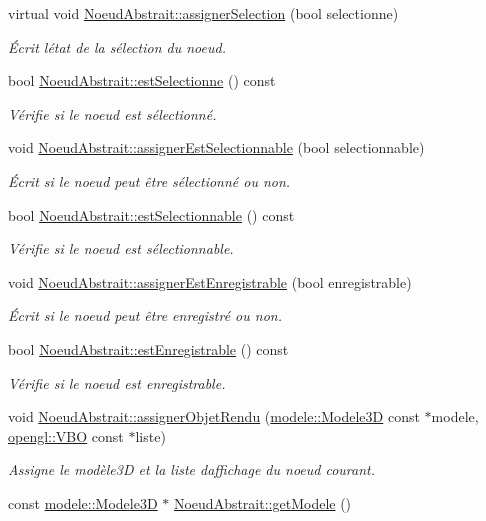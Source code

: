 \begin{DoxyCompactItemize}
virtual void \hyperlink{group__inf2990_ga0f39647390d357d8662a870f0c76242c}{Noeud\+Abstrait\+::assigner\+Selection} (bool selectionne)
\begin{DoxyCompactList}\small\item\em Écrit l\textquotesingle{}état de la sélection du noeud. \end{DoxyCompactList}\item 
bool \hyperlink{group__inf2990_ga8fb7a3313ce4d361ef7ec8e45ba8add5}{Noeud\+Abstrait\+::est\+Selectionne} () const 
\begin{DoxyCompactList}\small\item\em Vérifie si le noeud est sélectionné. \end{DoxyCompactList}\item 
void \hyperlink{group__inf2990_ga397add0bac7ec3b842598a2085990b7d}{Noeud\+Abstrait\+::assigner\+Est\+Selectionnable} (bool selectionnable)
\begin{DoxyCompactList}\small\item\em Écrit si le noeud peut être sélectionné ou non. \end{DoxyCompactList}\item 
bool \hyperlink{group__inf2990_gaa3f3a34571af62de0da5db2d8f54f690}{Noeud\+Abstrait\+::est\+Selectionnable} () const 
\begin{DoxyCompactList}\small\item\em Vérifie si le noeud est sélectionnable. \end{DoxyCompactList}\item 
void \hyperlink{group__inf2990_gabb7f3756a4094dc588690126ec0703d3}{Noeud\+Abstrait\+::assigner\+Est\+Enregistrable} (bool enregistrable)
\begin{DoxyCompactList}\small\item\em Écrit si le noeud peut être enregistré ou non. \end{DoxyCompactList}\item 
bool \hyperlink{group__inf2990_ga6a6af3639f1b4e3e33a126703376dcec}{Noeud\+Abstrait\+::est\+Enregistrable} () const 
\begin{DoxyCompactList}\small\item\em Vérifie si le noeud est enregistrable. \end{DoxyCompactList}\item 
void \hyperlink{group__inf2990_ga1f533acce98fbad7fa82758ccaea55ff}{Noeud\+Abstrait\+::assigner\+Objet\+Rendu} (\hyperlink{classmodele_1_1_modele3_d}{modele\+::\+Modele3\+D} const $\ast$modele, \hyperlink{classopengl_1_1_v_b_o}{opengl\+::\+V\+B\+O} const $\ast$liste)
\begin{DoxyCompactList}\small\item\em Assigne le modèle3\+D et la liste d\textquotesingle{}affichage du noeud courant. \end{DoxyCompactList}\item 
\hypertarget{group__inf2990_gacf20d310cd93a8ba2c3e4bc182398853}{}const \hyperlink{classmodele_1_1_modele3_d}{modele\+::\+Modele3\+D} $\ast$ \hyperlink{group__inf2990_gacf20d310cd93a8ba2c3e4bc182398853}{Noeud\+Abstrait\+::get\+Modele} ()\label{group__inf2990_gacf20d310cd93a8ba2c3e4bc182398853}


\end{DoxyCompactItemize}
